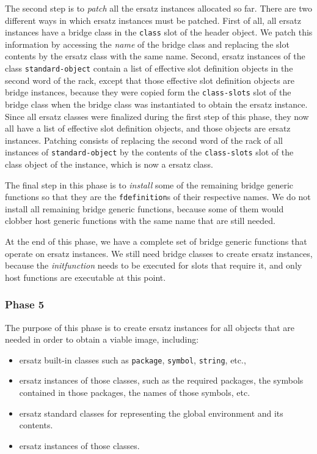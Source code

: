 The second step is to \emph{patch} all the ersatz instances allocated
so far.  There are two different ways in which ersatz instances must
be patched.  First of all, all ersatz instances have a bridge class in
the \texttt{class} slot of the header object.  We patch this
information by accessing the \emph{name} of the bridge class and
replacing the slot contents by the ersatz class with the same name.
Second, ersatz instances of the class \texttt{standard-object} contain
a list of effective slot definition objects in the second word of the
rack, except that those effective slot definition objects
are bridge instances, because they were copied form the
\texttt{class-slots} slot of the bridge class when the bridge class
was instantiated to obtain the ersatz instance.  Since all ersatz
classes were finalized during the first step of this phase, they now
all have a list of effective slot definition objects, and those
objects are ersatz instances.  Patching consists of replacing the
second word of the rack of all instances of
\texttt{standard-object} by the contents of the \texttt{class-slots}
slot of the class object of the instance, which is now a ersatz
class. 

The final step in this phase is to \emph{install} some of the
remaining bridge generic functions so that they are the
\texttt{fdefinition}s of their respective names.  We do not install
all remaining bridge generic functions, because some of them would
clobber host generic functions with the same name that are still
needed.  

At the end of this phase, we have a complete set of bridge generic
functions that operate on ersatz instances.  We still need bridge
classes to create ersatz instances, because the \emph{initfunction}
needs to be executed for slots that require it, and only host
functions are executable at this point.

\subsubsection{Phase 5}

The purpose of this phase is to create ersatz instances for all
objects that are needed in order to obtain a viable image, including: 

\begin{itemize}
\item ersatz built-in classes such as \texttt{package}, \texttt{symbol},
  \texttt{string}, etc., 
\item ersatz instances of those classes, such as the required
  packages, the symbols contained in those packages, the names of
  those symbols, etc.
\item ersatz standard classes for representing the global environment
  and its contents.
\item ersatz instances of those classes.
\end{itemize}

